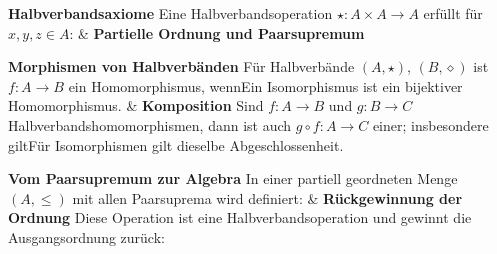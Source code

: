 \begin{BandUebersicht}
\textbf{Halbverbandsaxiome}
Eine Halbverbandsoperation \(\star:A\times A\to A\) erfüllt für
\(x,y,z\in A\):
&
\textbf{Partielle Ordnung und Paarsupremum}
 \\
\addlinespace[.8ex]

\textbf{Morphismen von Halbverbänden}
Für Halbverbände \((A,\star)\), \((B,\diamond)\) ist
\(f:A\to B\) ein Homomorphismus, wennEin Isomorphismus ist ein bijektiver Homomorphismus.
&
\textbf{Komposition}
Sind \(f:A\to B\) und \(g:B\to C\) Halbverbandshomomorphismen,
dann ist auch \(g\circ f:A\to C\) einer; insbesondere giltFür Isomorphismen gilt dieselbe Abgeschlossenheit.
 \\
\addlinespace[.8ex]

\textbf{Vom Paarsupremum zur Algebra}
In einer partiell geordneten Menge \((A,\le)\) mit allen
Paarsuprema wird definiert:
&
\textbf{Rückgewinnung der Ordnung}
Diese Operation ist eine Halbverbandsoperation und gewinnt
die Ausgangsordnung zurück:
 \\
\addlinespace[.8ex]


\end{BandUebersicht}
